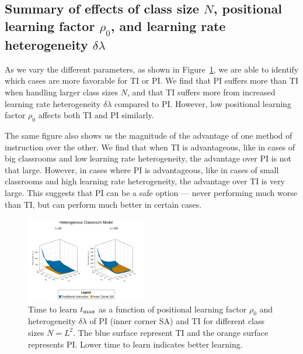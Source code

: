\documentclass[twocolumn,secnumarabic,amssymb, nobibnotes, aps, prd]{revtex4-2}
\begin{document}
    \subsection{Summary of effects of class size $N$, positional learning factor $\rho_0$, and learning rate heterogeneity $\delta\lambda$}
        
        As we vary the different parameters, as shown in Figure~\ref{fig:Params effect summary t}, we are able to identify which cases are more favorable for TI or PI.
        We find that PI suffers more than TI when handling larger class sizes $N$, and that TI suffers more from increased learning rate heterogeneity $\delta\lambda$ compared to PI.
        However, low positional learning factor $\rho_0$ affects both TI and PI similarly.

        The same figure also shows us the magnitude of the advantage of one method of instruction over the other.
        We find that when TI is advantageous, like in cases of big classrooms and low learning rate heterogeneity, the advantage over PI is not that large.
        However, in cases where PI is advantageous, like in cases of small classrooms and high learning rate heterogeneity, the advantage over TI is very large.
        This suggests that PI can be a safe option --- never performing much worse than TI, but can perform much better in certain cases.

        \begin{figure}[htbp!]
            \centering
            \includegraphics[width=0.47\textwidth]{figures/2D-BPCAIH-analysis/rho-dl-t plots/32-128 comparison.png}
            \caption{Time to learn $t_{\rm max}$ as a function of positional learning factor $\rho_0$ and heterogeneity $\delta\lambda$ of PI (inner corner SA) and TI for different class sizes $N=L^2$.
            The blue surface represent TI and the orange surface represents PI.
            Lower time to learn indicates better learning.}
            \label{fig:Params effect summary t}
        \end{figure}
\end{document}
